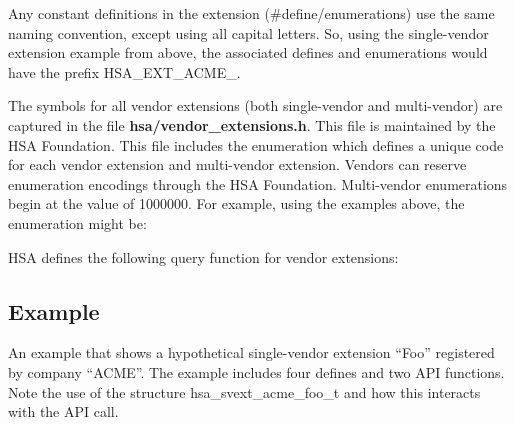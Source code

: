 \documentclass[draft]{book}
\newcommand{\reftyp}[1]{#1}
\newcommand{\refenu}[1]{\reftyp{#1}}
\begin{document}
Any constant definitions in the extension (\#define/enumerations) use the same
naming convention, except using all capital letters. So, using the single-vendor
extension example from above, the associated defines and enumerations would have
the prefix \refenu{HSA_EXT_ACME_}.

The symbols for all vendor extensions (both single-vendor and multi-vendor) are
captured in the file {\bf hsa/vendor_extensions.h}. This file is maintained by
the HSA Foundation. This file includes the enumeration
 which defines a unique code for each vendor
extension and multi-vendor extension. Vendors can reserve enumeration encodings
through the HSA Foundation. Multi-vendor enumerations begin at the value of
1000000. For example, using the examples above, the
 enumeration might be:



HSA defines the following query function for vendor extensions:



\subsection{Example}
An example that shows a hypothetical single-vendor extension ``Foo'' registered
by company ``ACME''. The example includes four defines and two API functions.
Note the use of the structure \reftyp{hsa_svext_acme_foo_t} and how this
interacts with the  API call.


\end{document}

